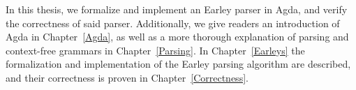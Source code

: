 	In this thesis, we formalize and implement an Earley parser in Agda, and
	verify the correctness of said parser. Additionally, we give readers an
	introduction of Agda in Chapter~\ref{Agda}, as well as a more thorough
	explanation of parsing and context-free grammars in Chapter~\ref{Parsing}.
	In Chapter~\ref{Earleys} the formalization and implementation of the Earley
	parsing algorithm are described, and their correctness is
        proven in Chapter~\ref{Correctness}.

